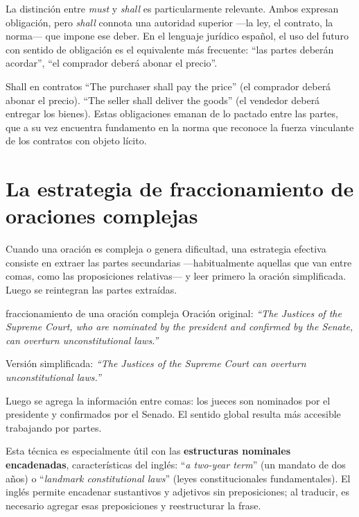 \documentclass[12pt,oneside]{book}
\begin{document}
La distinción entre \textit{must} y \textit{shall} es particularmente relevante. Ambos expresan obligación, pero \textit{shall} connota una autoridad superior ---la ley, el contrato, la norma--- que impone ese deber. En el lenguaje jurídico español, el uso del futuro con sentido de obligación es el equivalente más frecuente: ``las partes deberán acordar'', ``el comprador deberá abonar el precio''.

\begin{example}{Shall en contratos}
``The purchaser shall pay the price'' (el comprador deberá abonar el precio). ``The seller shall deliver the goods'' (el vendedor deberá entregar los bienes). Estas obligaciones emanan de lo pactado entre las partes, que a su vez encuentra fundamento en la norma que reconoce la fuerza vinculante de los contratos con objeto lícito.
\end{example}

\section{La estrategia de fraccionamiento de oraciones complejas}

Cuando una oración es compleja o genera dificultad, una estrategia efectiva consiste en extraer las partes secundarias ---habitualmente aquellas que van entre comas, como las proposiciones relativas--- y leer primero la oración simplificada. Luego se reintegran las partes extraídas.

\begin{example}{fraccionamiento de una oración compleja}
Oración original: \textit{``The Justices of the Supreme Court, who are nominated by the president and confirmed by the Senate, can overturn unconstitutional laws.''}

Versión simplificada: \textit{``The Justices of the Supreme Court can overturn unconstitutional laws.''}

Luego se agrega la información entre comas: los jueces son nominados por el presidente y confirmados por el Senado. El sentido global resulta más accesible trabajando por partes.
\end{example}

Esta técnica es especialmente útil con las \textbf{estructuras nominales encadenadas}, características del inglés: ``\textit{a two-year term}'' (un mandato de dos años) o ``\textit{landmark constitutional laws}'' (leyes constitucionales fundamentales). El inglés permite encadenar sustantivos y adjetivos sin preposiciones; al traducir, es necesario agregar esas preposiciones y reestructurar la frase.
\end{document}
